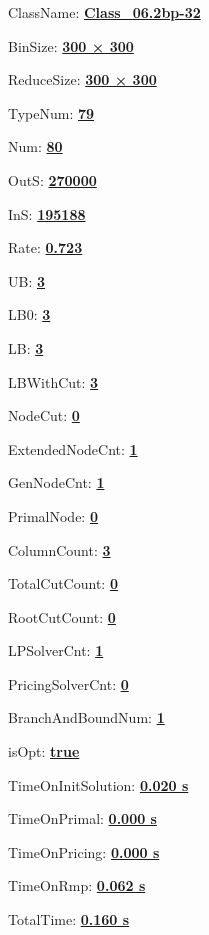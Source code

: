 \documentclass[11pt]{article}
\begin{document}
\pagestyle{empty}


ClassName: \underline{\textbf{Class_06.2bp-32}}
\par
BinSize: \underline{\textbf{300 × 300}}
\par
ReduceSize: \underline{\textbf{300 × 300}}
\par
TypeNum: \underline{\textbf{79}}
\par
Num: \underline{\textbf{80}}
\par
OutS: \underline{\textbf{270000}}
\par
InS: \underline{\textbf{195188}}
\par
Rate: \underline{\textbf{0.723}}
\par
UB: \underline{\textbf{3}}
\par
LB0: \underline{\textbf{3}}
\par
LB: \underline{\textbf{3}}
\par
LBWithCut: \underline{\textbf{3}}
\par
NodeCut: \underline{\textbf{0}}
\par
ExtendedNodeCnt: \underline{\textbf{1}}
\par
GenNodeCnt: \underline{\textbf{1}}
\par
PrimalNode: \underline{\textbf{0}}
\par
ColumnCount: \underline{\textbf{3}}
\par
TotalCutCount: \underline{\textbf{0}}
\par
RootCutCount: \underline{\textbf{0}}
\par
LPSolverCnt: \underline{\textbf{1}}
\par
PricingSolverCnt: \underline{\textbf{0}}
\par
BranchAndBoundNum: \underline{\textbf{1}}
\par
isOpt: \underline{\textbf{true}}
\par
TimeOnInitSolution: \underline{\textbf{0.020 s}}
\par
TimeOnPrimal: \underline{\textbf{0.000 s}}
\par
TimeOnPricing: \underline{\textbf{0.000 s}}
\par
TimeOnRmp: \underline{\textbf{0.062 s}}
\par
TotalTime: \underline{\textbf{0.160 s}}
\par
\newpage
\end{document}
